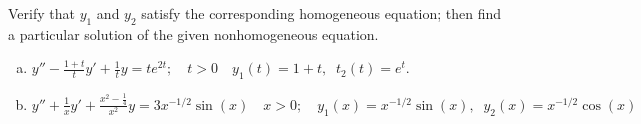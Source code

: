 \documentclass[12pt,letterpaper]{hmcpset}
\begin{document}
\begin{solution}
    \vfill
\end{solution}
\clearpage

\begin{problem}[F8]
    Verify that $y_1$ and $y_2$ satisfy the corresponding homogeneous 
    equation; then find a particular
    solution of the given nonhomogeneous equation.
    \begin{enumerate}[(a)]
        \item $y'' - \frac{1+t}{t}y' + \frac{1}{t}y=te^{2t};
            \quad t>0 \quad y_1(t)=1+t,\;\;t_2(t)=e^t$.
        \item $y''+\frac{1}{x}y' + \frac{x^2-\frac{1}{4}}{x^2}y = 3x^{-1/2}\sin(x)
            \quad x>0; \quad y_1(x)=x^{-1/2}\sin(x),\;\;y_2(x)=x^{-1/2}\cos(x)$
    \end{enumerate}
\end{problem}

\begin{solution}
    \vfill
\end{solution}
\clearpage
\end{document}
